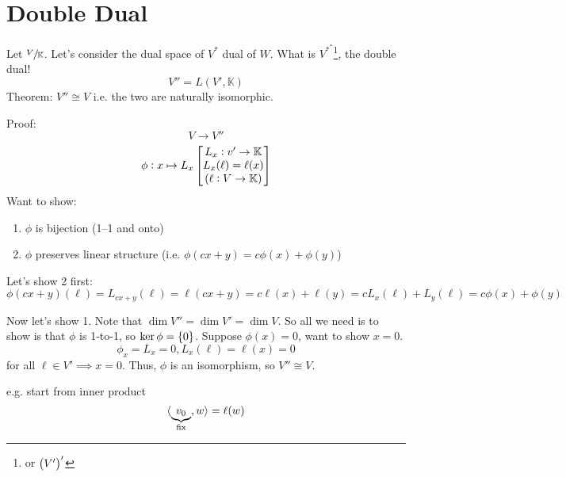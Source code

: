 \documentclass{article}
\DeclarePairedDelimiter\ip{\langle }{\rangle}
\newcommand{\m}[1]{\begin{bmatrix} #1 \end{bmatrix}}
\begin{document}
\section{Double Dual}

Let \(\sfrac{V}{\mathbb{K}}\).
Let's consider the dual space of \(V^*\) dual of \(W\).
What is \(V^*^*\)\footnote{or \(\del{V'}'\)}, the double dual!
\[V'' = L(V', \mathbb{K})\]
Theorem: \(V'' \cong V\) i.e. the two are naturally isomorphic.

Proof:
\[V \to V''\]
\[\phi: x \mapsto L_x \m{L_x : v' \to \mathbb{K}\\L_x(\ell) = \ell(x)\\\del{\ell: V \to \mathbb{K}}}\]
Want to show:
\begin{enumerate}
\item \(\phi\) is bijection (1--1 and onto)
\item \(\phi\) preserves linear structure (i.e. \(\phi(cx + y) = c\phi(x) + \phi(y)\))
\end{enumerate}

Let's show 2 first:
\[\phi(cx + y)(\ell) = L_{cx+y}(\ell) = \ell(cx + y) = c\ell(x) + \ell(y) = cL_x(\ell) + L_y(\ell) = c\phi(x) + \phi(y)\]


Now let's show 1.
Note that \(\dim V'' = \dim V' = \dim V\).
So all we need is to show is that \(\phi\) is 1-to-1, so \(\ker \phi = \set{0}\).
Suppose \(\phi(x) = 0\), want to show \(x = 0\).
\[\phi_x = L_x = 0, L_x(\ell) = \ell(x) = 0\]
for all \(\ell \in V' \implies x = 0\).
Thus, \(\phi\) is an isomorphism, so \(V'' \cong V\).

e.g. start from inner product
\[\ip{\underbrace{v_0}_{\text{fix}}, w} = \ell(w)\]
\end{document}
